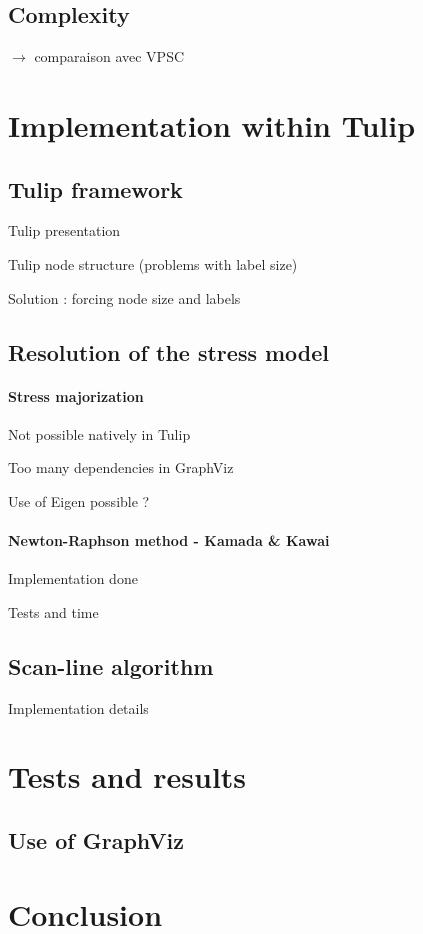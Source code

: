 \documentclass[12pt]{report}
\begin{document}
\section{Complexity}


$\rightarrow$ comparaison avec VPSC
\chapter{Implementation within Tulip}

\section{Tulip framework}

Tulip presentation \cite{AA12}

Tulip node structure (problems with label size)

Solution : forcing node size and labels

\section{Resolution of the stress model}
\subsubsection{Stress majorization}
Not possible natively in Tulip

Too many dependencies in GraphViz

Use of Eigen possible ?
\subsubsection{Newton-Raphson method - Kamada \& Kawai}
Implementation done

Tests and time
\section{Scan-line algorithm}
Implementation details
\chapter{Tests and results}

\section{Use of GraphViz}

\chapter{Conclusion}



\end{document}
